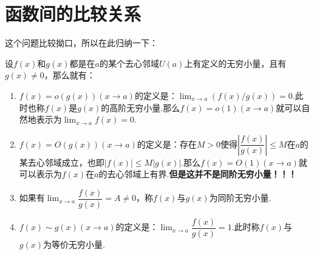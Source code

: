 \section{函数间的比较关系}

这个问题比较拗口，所以在此归纳一下：

\begin{definition}
	设$f(x)$和$g(x)$都是在$a$的某个去心邻域$U(a)$上有定义的无穷小量，且有$g(x)\neq 0$，那么就有：
	\begin{enumerate}
		\item $f(x)=o(g(x))(x\rightarrow a)$的定义是：$\displaystyle\lim_{x\to a}\left(f(x)/g(x)\right)=0$.此时也称$f(x)$是$g(x)$的高阶无穷小量.那么$f(x)=o(1)(x\rightarrow a)$就可以自然地表示为$\displaystyle\lim_{x\to a}f(x)=0.$
		\item $f(x)=O(g(x))(x\rightarrow a)$的定义是：存在$M>0$使得$|\dfrac{f(x)}{g(x)}|\leq M$在$a$的某去心邻域成立，也即$|f(x)|\leq M|g(x)|$.那么$f(x)=O(1)(x\rightarrow a)$就可以表示为$f(x)$在$a$的去心邻域上有界.\textbf{但是这并不是同阶无穷小量！！！}
		\item 如果有$\displaystyle\lim_{x\to a}\dfrac{f(x)}{g(x)}=A\neq 0$，称$f(x)$与$g(x)$为同阶无穷小量.
		\item $f(x)\sim g(x)(x\rightarrow a)$的定义是：$\displaystyle\lim_{x\to  a}\dfrac{f(x)}{g(x)}=1$.此时称$f(x)$与$g(x)$为等价无穷小量.
	\end{enumerate}
\end{definition}
	